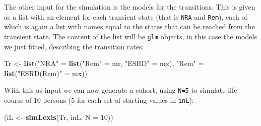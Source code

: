 \documentclass[
]{book}
\newenvironment{Shaded}{\begin{snugshade}}{\end{snugshade}}
\newcommand{\AttributeTok}[1]{\textcolor[rgb]{0.13,0.29,0.53}{#1}}
\newcommand{\DecValTok}[1]{\textcolor[rgb]{0.00,0.00,0.81}{#1}}
\newcommand{\FunctionTok}[1]{\textcolor[rgb]{0.13,0.29,0.53}{\textbf{#1}}}
\newcommand{\NormalTok}[1]{#1}
\newcommand{\OtherTok}[1]{\textcolor[rgb]{0.56,0.35,0.01}{#1}}
\newcommand{\StringTok}[1]{\textcolor[rgb]{0.31,0.60,0.02}{#1}}
\theoremstyle{definition}
\theoremstyle{definition}
\theoremstyle{definition}
\theoremstyle{definition}
\theoremstyle{remark}
\begin{document}
\begin{enumerate}
  The other input for the simulation is the models for the transitions. This is given as
  a list with an element for each transient state (that is \texttt{NRA} and
  \texttt{Rem}), each of which is again a list with names equal to the
  states that can be reached from the transient state. The content of
  the list will be \texttt{glm} objects, in this case the models we
  just fitted, describing the transition rates:

\begin{Shaded}
\begin{Highlighting}[]
\NormalTok{Tr }\OtherTok{\textless{}{-}} \FunctionTok{list}\NormalTok{(}\StringTok{"NRA"} \OtherTok{=} \FunctionTok{list}\NormalTok{(}\StringTok{"Rem"}  \OtherTok{=}\NormalTok{ mr,}
                        \StringTok{"ESRD"} \OtherTok{=}\NormalTok{ mx),}
           \StringTok{"Rem"} \OtherTok{=} \FunctionTok{list}\NormalTok{(}\StringTok{"ESRD(Rem)"} \OtherTok{=}\NormalTok{ mx))}
\end{Highlighting}
\end{Shaded}

  With this as input we can now generate a cohort, using \texttt{N=5}
  to simulate life course of 10 persons (5 for each set of starting values
  in \texttt{inL}):

\begin{Shaded}
\begin{Highlighting}[]
\NormalTok{(iL }\OtherTok{\textless{}{-}} \FunctionTok{simLexis}\NormalTok{(Tr, inL, }\AttributeTok{N =} \DecValTok{10}\NormalTok{))}
\end{Highlighting}
\end{Shaded}


\end{enumerate}
\end{document}
